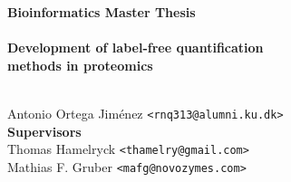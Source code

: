 \documentclass[11pt, a4paper]{report}
\begin{document}
    \thispagestyle{empty}
    \begin{adjustwidth}{-3cm}{-1.5cm}
    \vspace*{-1cm}
    \textbf{\Huge Bioinformatics Master Thesis} \\
    \vspace*{2.5cm} \\
    \textbf{\Huge Development of label-free quantification \\ methods in proteomics} \\
    \vspace*{.1cm} \\
    \begin{tabbing}
    Antonio Ortega Jiménez \hspace{1cm} \= \texttt{<rnq313@alumni.ku.dk>}
    \\[10.5cm] 
    
    \textbf{\Large Supervisors} \\
    Thomas Hamelryck \> \texttt{<thamelry@gmail.com>} \\
    Mathias F. Gruber \> \texttt{<mafg@novozymes.com>} \\

    \end{tabbing}
    \end{adjustwidth}
    \ClearWallPaper

\setcounter{tocdepth}{2}
\tableofcontents %
\listoffigures   %
\newpage

\thispagestyle{empty}
\printacronyms[include-classes=abbrev,name=Abbreviations]

\newpage
\setcounter{page}{1}

\let\oldthebibliography\thebibliography
\let\endoldthebibliography\endthebibliography
\renewenvironment{thebibliography}[1]{
  \begin{oldthebibliography}{#1}
    \setlength{\itemsep}{0em}
    \setlength{\parskip}{0em}
}
{
  \end{oldthebibliography}
}
\end{document}
